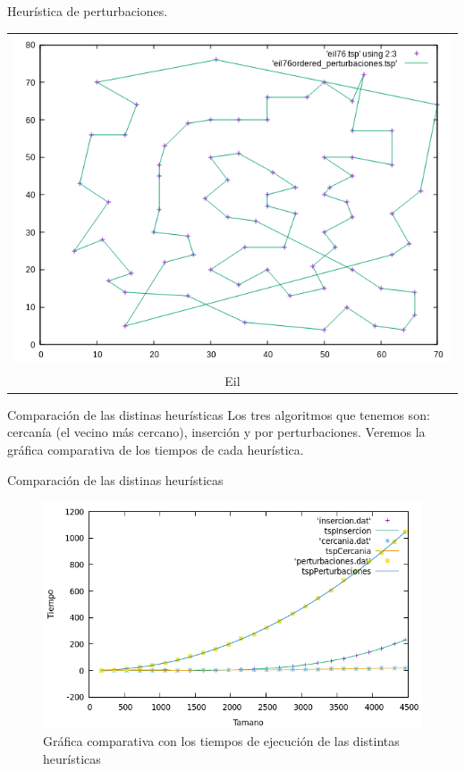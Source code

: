 \documentclass[10pt, xcolor=table]{beamer}
\begin{document}
\begin{frame}[fragile]{Heurística de perturbaciones. }
\begin{center}
\begin{tabular}{c}
\includegraphics[scale=0.23]{./Images/eil_perturbaciones.png} \\
Eil
\end{tabular}
\end{center}
\end{frame}

\begin{frame}[fragile]{Comparación de las distinas heurísticas}
Los tres algoritmos que tenemos son: cercanía (el vecino más cercano), inserción y por perturbaciones. Veremos la gráfica comparativa de los tiempos de cada heurística.

\end{frame}
\begin{frame}[fragile]{Comparación de las distinas heurísticas}

\begin{figure}[h!]
 	\centering
 	\includegraphics[scale=0.45]{./Images/comparativa_tiempos.png}
 	\caption{Gráfica comparativa con los tiempos de ejecución de las distintas heurísticas}
 \end{figure}

\end{frame}
 
\end{document}

